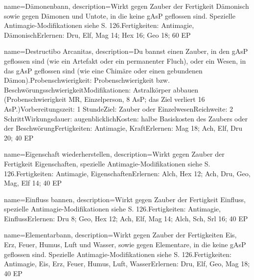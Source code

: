 {
    name={Dämonenbann},
    description={Wirkt gegen Zauber der Fertigkeit Dämonisch sowie gegen Dämonen und Untote, in die keine gAsP geflossen sind. Spezielle Antimagie-Modifikationen siehe S. 126.\newline Fertigkeiten: Antimagie, Dämonisch\newline Erlernen: Dru, Elf, Mag 14; Hex 16; Geo 18; 60 EP}
}


{
    name={Destructibo Arcanitas},
    description={Du bannst einen Zauber, in den gAsP geflossen sind (wie ein Artefakt oder ein permanenter Fluch), oder ein Wesen, in das gAsP geflossen sind (wie eine Chimäre oder einen gebundenen Dämon).\newline Probenschwierigkeit: Probenschwierigkeit bzw. Beschwörungsschwierigkeit\newline Modifikationen: Astralkörper abbauen (Probenschwierigkeit MR, Einzelperson, 8 AsP; das Ziel verliert 16 AsP.)\newline Vorbereitungszeit: 1 Stunde\newline Ziel: Zauber oder Einzelwesen\newline Reichweite: 2 Schritt\newline Wirkungsdauer: augenblicklich\newline Kosten: halbe Basiskosten des Zaubers oder der Beschwörung\newline Fertigkeiten: Antimagie, Kraft\newline Erlernen: Mag 18; Ach, Elf, Dru 20; 40 EP}
}


{
    name={Eigenschaft wiederherstellen},
    description={Wirkt gegen Zauber der Fertigkeit Eigenschaften, spezielle Antimagie-Modifikationen siehe S. 126.\newline Fertigkeiten: Antimagie, Eigenschaften\newline Erlernen: Alch, Hex 12; Ach, Dru, Geo, Mag, Elf 14; 40 EP}
}


{
    name={Einfluss bannen},
    description={Wirkt gegen Zauber der Fertigkeit Einfluss, spezielle Antimagie-Modifikationen siehe S. 126.\newline Fertigkeiten: Antimagie, Einfluss\newline Erlernen: Dru 8; Geo, Hex 12; Ach, Elf, Mag 14; Alch, Sch, Srl 16; 40 EP}
}


{
    name={Elementarbann},
    description={Wirkt gegen Zauber der Fertigkeiten Eis, Erz, Feuer, Humus, Luft und Wasser, sowie gegen Elementare, in die keine gAsP geflossen sind. Spezielle Antimagie-Modifikationen siehe S. 126.\newline Fertigkeiten: Antimagie, Eis, Erz, Feuer, Humus, Luft, Wasser\newline Erlernen: Dru, Elf, Geo, Mag 18; 40 EP}
}


